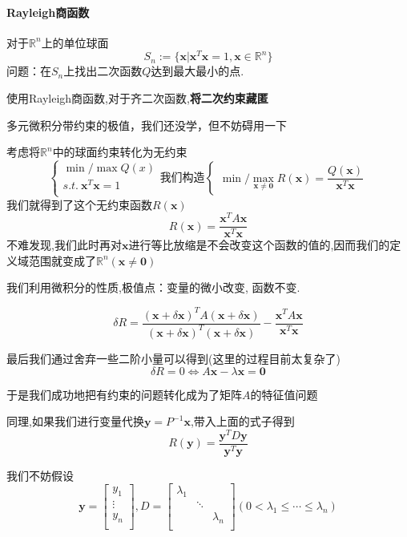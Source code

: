 \documentclass{article}
\newcommand{\RR}{\mathbb{R}}
\newcommand{\ve}{\boldsymbol}
\begin{document}
\begin{CJK}{UTF8}{gkai}
\paragraph{Rayleigh商函数}
对于$\RR^n$上的单位球面
\[S_n := \{\ve{x}|\ve{x}^T \ve{x} = 1,\ve{x}\in \RR^n\}\]
问题：在$S_n$上找出二次函数$Q$达到最大最小的点.

使用Rayleigh商函数,对于齐二次函数,\textbf{将二次约束藏匿}

多元微积分带约束的极值，我们还没学，但不妨碍用一下

考虑将$\RR^n$中的球面约束转化为无约束
\begin{equation*}
    \begin{cases}
        \min/\max Q(x)\\
        s.t. ~\ve{x}^T \ve{x} = 1\\
    \end{cases}
    \text{我们构造}
    \begin{cases}
        \min/\max_{\ve{x} \neq \ve{0}} R(\ve{x}) = \dfrac{Q(\ve{x})}{\ve{x}^T\ve{x}} 
    \end{cases}
\end{equation*}
我们就得到了这个无约束函数$R(\ve{x})$
\[R(\ve{x}) = \dfrac{\ve{x}^T A \ve{x}}{\ve{x}^T \ve{x}}\]
不难发现,我们此时再对$\ve{x}$进行等比放缩是不会改变这个函数的值的,因而我们的定义域范围就变成了$\RR^n(\ve{x}\neq \ve{0})$

我们利用微积分的性质,极值点：变量的微小改变, 函数不变. 

\[\delta R  = \dfrac{(\ve{x} + \delta \ve{x})^T A (\ve{x} + \delta \ve{x})}{(\ve{x} + \delta \ve{x})^T(\ve{x} + \delta \ve{x})} - \dfrac{\ve{x}^T A \ve{x}}{\ve{x}^T \ve{x}}\]

最后我们通过舍弃一些二阶小量可以得到(这里的过程目前太复杂了)
\[\delta R = 0\Leftrightarrow A \ve{x} - \lambda \ve{x} = \ve{0}\]

于是我们成功地把有约束的问题转化成为了矩阵$A$的特征值问题

同理,如果我们进行变量代换$\ve{y} = P^{-1} \ve{x}$,带入上面的式子得到
\[R(\ve{y}) = \dfrac{\ve{y}^T D \ve{y}}{\ve{y}^T \ve{y}}\]

我们不妨假设
\[ \ve{y} =
\begin{bmatrix}
y_1\\
\vdots\\
y_n \\    
\end{bmatrix}
,
D = \begin{bmatrix}
    \lambda_1&&\\
    &\ddots&\\
    &&\lambda_n\\
\end{bmatrix}
(0 < \lambda_1 \leq \cdots \leq \lambda_n)
\]


\end{CJK}
\end{document}
